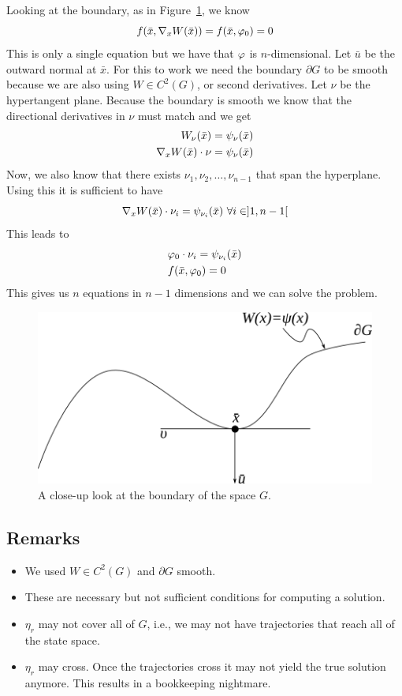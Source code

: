 Looking at the boundary, as in Figure~\ref{fig:15gboundary}, we know
$$f(\bar{x},\nabla_xW(\bar{x})) = f(\bar{x},\varphi_0) = 0$$
This is only a single equation but we have that $\varphi$ is $n$-dimensional.
Let $\bar{u}$ be the outward normal at $\bar{x}$.
For this to work we need the boundary $\partial G$ to be smooth because we are also using $W\in C^2(G)$, or second derivatives.
Let $\nu$ be the hypertangent plane.
Because the boundary is smooth we know that the directional derivatives in $\nu$ must match and we get
\begin{align*}
W_\nu(\bar{x}) &= \psi_\nu(\bar{x}) \\
\nabla_xW(\bar{x})\cdot \nu &= \psi_\nu(\bar{x})
\end{align*}
Now, we also know that there exists $\nu_1,\nu_2,\ldots,\nu_{n-1}$ that span the hyperplane.
Using this it is sufficient to have
$$\nabla_xW(\bar{x})\cdot\nu_i = \psi_{\nu_i}(\bar{x})~\forall i\in]1,n-1[$$
This leads to
\begin{align*}
&\varphi_0\cdot\nu_i = \psi_{\nu_i}(\bar{x}) \\
&f(\bar{x},\varphi_0) = 0
\end{align*}
This gives us $n$ equations in $n-1$ dimensions and we can solve the problem.

\begin{figure}[ht!]
\centering
\includegraphics[width=.4\textwidth]{images/15gboundary}
\caption{A close-up look at the boundary of the space $G$.}
\label{fig:15gboundary}
\end{figure}

\subsection{Remarks}
\begin{itemize}
\item We used $W\in C^2(G)$ and $\partial G$ smooth.
\item These are necessary but not sufficient conditions for computing a solution.
\item $\eta_r$ may not cover all of $G$, i.e., we may not have trajectories that reach all of the state space.
\item $\eta_r$ may cross.
      Once the trajectories cross it may not yield the true solution anymore.
      This results in a bookkeeping nightmare.
\end{itemize}

